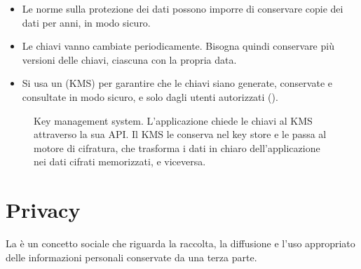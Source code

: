 \begin{itemize}
  \item Le norme sulla protezione dei dati possono imporre di conservare copie dei dati per anni, in modo sicuro.
  \item Le chiavi vanno cambiate periodicamente. Bisogna quindi conservare più versioni delle chiavi, ciascuna con la
    propria data.
  \item Si usa un  (KMS) per garantire che le chiavi siano generate, conservate e
    consultate in modo sicuro, e solo dagli utenti autorizzati ().
\end{itemize}

\begin{figure}[ht]
\centering
{}
\caption{Key management system. L'applicazione chiede le chiavi al KMS attraverso la sua API. Il KMS le conserva nel
key store e le passa al motore di cifratura, che trasforma i dati in chiaro dell'applicazione nei dati cifrati
memorizzati, e viceversa.}
\label{fig:sic-kms}
\end{figure}

\section{Privacy}
\label{sec:sic-privacy}

\begin{definizione}[Privacy]
La  è un concetto sociale che riguarda la raccolta, la diffusione e l'uso appropriato delle
informazioni personali conservate da una terza parte.
\end{definizione}

